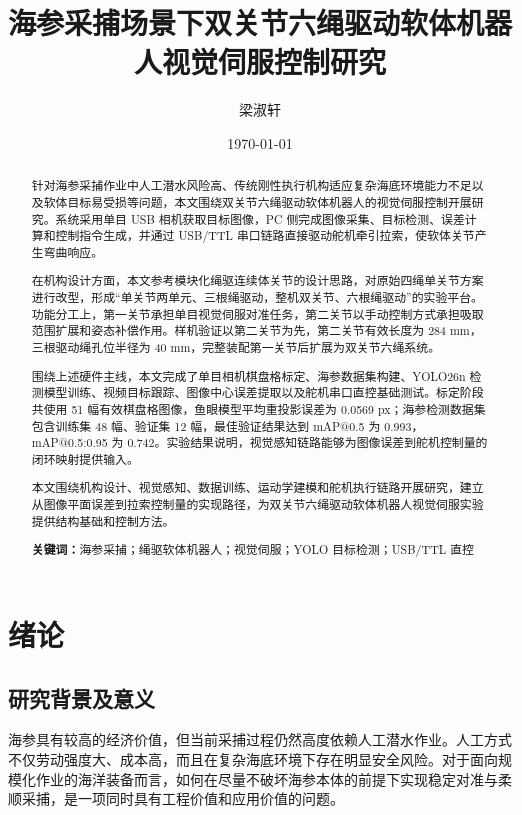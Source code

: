 \documentclass[UTF8,zihao=-4,oneside]{ctexrep}
\title{\heiti 海参采捕场景下双关节六绳驱动软体机器人视觉伺服控制研究}
\author{梁淑轩}
\date{\today}
\begin{document}
\maketitle

\begin{abstract}
针对海参采捕作业中人工潜水风险高、传统刚性执行机构适应复杂海底环境能力不足以及软体目标易受损等问题，本文围绕双关节六绳驱动软体机器人的视觉伺服控制开展研究。系统采用单目 USB 相机获取目标图像，PC 侧完成图像采集、目标检测、误差计算和控制指令生成，并通过 USB/TTL 串口链路直接驱动舵机牵引拉索，使软体关节产生弯曲响应。

在机构设计方面，本文参考模块化绳驱连续体关节的设计思路，对原始四绳单关节方案进行改型，形成“单关节两单元、三根绳驱动，整机双关节、六根绳驱动”的实验平台。功能分工上，第一关节承担单目视觉伺服对准任务，第二关节以手动控制方式承担吸取范围扩展和姿态补偿作用。样机验证以第二关节为先，第二关节有效长度为 284 mm，三根驱动绳孔位半径为 40 mm，完整装配第一关节后扩展为双关节六绳系统。

围绕上述硬件主线，本文完成了单目相机棋盘格标定、海参数据集构建、YOLO26n 检测模型训练、视频目标跟踪、图像中心误差提取以及舵机串口直控基础测试。标定阶段共使用 51 幅有效棋盘格图像，鱼眼模型平均重投影误差为 0.0569 px；海参检测数据集包含训练集 48 幅、验证集 12 幅，最佳验证结果达到 mAP@0.5 为 0.993，mAP@0.5:0.95 为 0.742。实验结果说明，视觉感知链路能够为图像误差到舵机控制量的闭环映射提供输入。

本文围绕机构设计、视觉感知、数据训练、运动学建模和舵机执行链路开展研究，建立从图像平面误差到拉索控制量的实现路径，为双关节六绳驱动软体机器人视觉伺服实验提供结构基础和控制方法。

\noindent\textbf{关键词：}海参采捕；绳驱软体机器人；视觉伺服；YOLO 目标检测；USB/TTL 直控
\end{abstract}

\tableofcontents

\chapter{绪论}

\section{研究背景及意义}

海参具有较高的经济价值，但当前采捕过程仍然高度依赖人工潜水作业。人工方式不仅劳动强度大、成本高，而且在复杂海底环境下存在明显安全风险。对于面向规模化作业的海洋装备而言，如何在尽量不破坏海参本体的前提下实现稳定对准与柔顺采捕，是一项同时具有工程价值和应用价值的问题。
\end{document}
